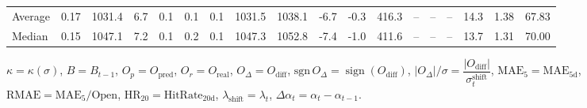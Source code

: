 \begin{threeparttable}
{\begin{tabular}{lrrrrrrrrrrrrrrrrr}
Average &     0.17 & 1031.4 &               6.7 &               0.1 &                0.1 &                0.1 & 1031.5 & 1038.1 &       -6.7 &                     -0.3 &               416.3 &         -- &        -- &             -- &             14.3 &            1.38 &                  67.83 \\
 Median &     0.15 & 1047.1 &               7.2 &               0.1 &                0.2 &                0.1 & 1047.3 & 1052.8 &       -7.4 &                     -1.0 &               411.6 &         -- &        -- &             -- &             13.7 &            1.31 &                  70.00 \\
\bottomrule
\end{tabular}
}
\begin{tablenotes}\footnotesize
\item $\kappa=\kappa(\sigma)$, $B=B_{t-1}$, $O_p=O_{\text{pred}}$, $O_r=O_{\text{real}}$, $O_\Delta=O_{\text{diff}}$, $\mathrm{sgn}\,O_\Delta=\operatorname{sign}(O_{\text{diff}})$, $|O_\Delta|/\sigma=\dfrac{|O_{\text{diff}}|}{\sigma_t^{\text{shift}}}$, $\mathrm{MAE}_5=\mathrm{MAE}_{5\text{d}}$, $\mathrm{RMAE}= \mathrm{MAE}_5 / \text{Open}$, $\mathrm{HR}_{20}=\mathrm{HitRate}_{20\text{d}}$, 
$\lambda_{\text{shift}}=\lambda_t$, 
$\Delta\alpha_t=\alpha_t-\alpha_{t-1}$.
\end{tablenotes}
\end{threeparttable}
\endgroup

